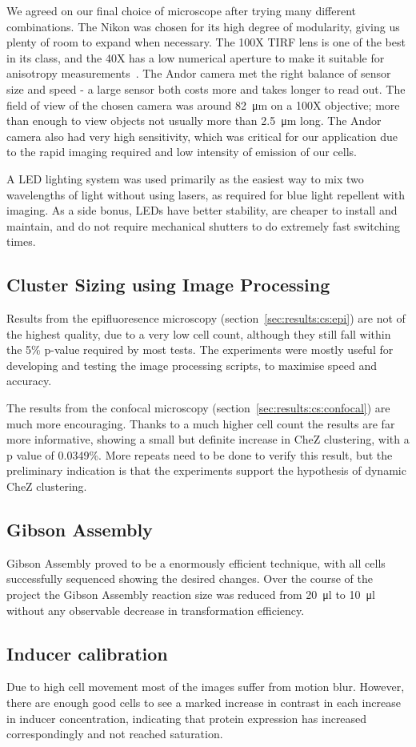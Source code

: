 \documentclass[../main.tex]{subfiles}
\begin{document}
We agreed on our final choice of microscope after trying many different combinations. The Nikon was chosen for its high degree of modularity, giving us plenty of room to expand when necessary. The 100X TIRF lens is one of the best in its class, and the 40X has a low numerical aperture to make it suitable for anisotropy measurements~\citep{lakowicz}. The Andor camera met the right balance of sensor size and speed - a large sensor both costs more and takes longer to read out. The field of view of the chosen camera was around \SI{82}{\micro\meter} on a 100X objective; more than enough to view objects not usually more than \SI{2.5}{\micro\meter} long. The Andor camera also had very high sensitivity, which was critical for our application due to the rapid imaging required and low intensity of emission of our cells.

A LED lighting system was used primarily as the easiest way to mix two wavelengths of light without using lasers, as required for blue light repellent with imaging. As a side bonus, LEDs have better stability, are cheaper to install and maintain, and do not require mechanical shutters to do extremely fast switching times. 

\subsection{Cluster Sizing using Image Processing}

Results from the epifluoresence microscopy (section~\ref{sec:results:cs:epi}) are not of the highest quality, due to a very low cell count, although they still fall within the 5\% p-value required by most tests. The experiments were mostly useful for developing and testing the image processing scripts, to maximise speed and accuracy.

The results from the confocal microscopy (section~\ref{sec:results:cs:confocal}) are much more encouraging. Thanks to a much higher cell count the results are far more informative, showing a small but definite increase in CheZ clustering, with a p value of 0.0349\%. More repeats need to be done to verify this result, but the preliminary indication is that the experiments support the hypothesis of dynamic CheZ clustering.

\subsection{Gibson Assembly}
Gibson Assembly proved to be a enormously efficient technique, with all cells successfully sequenced showing the desired changes. Over the course of the project the Gibson Assembly reaction size was reduced from \SI{20}{\micro\litre} to \SI{10}{\micro\litre} without any observable decrease in transformation efficiency. 

\subsection{Inducer calibration}

Due to high cell movement most of the images suffer from motion blur. However, there are enough good cells to see a marked increase in contrast in each increase in inducer concentration, indicating that protein expression has increased correspondingly and not reached saturation.
\end{document}
